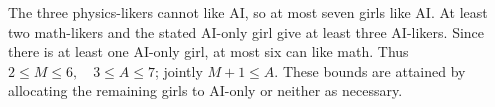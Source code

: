 The three physics-likers cannot like AI, so at most seven girls like AI. At least two math-likers and the stated AI-only girl give at least three AI-likers. Since there is at least one AI-only girl, at most six can like math. Thus $\boxed{2\le M\le6,\quad3\le A\le7}$; jointly $M+1\le A$. These bounds are attained by allocating the remaining girls to AI-only or neither as necessary.
